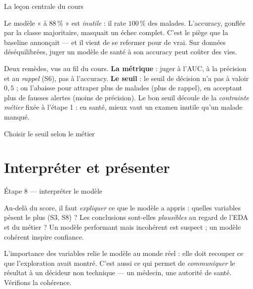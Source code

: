 \documentclass[aspectratio=169,11pt]{beamer}
\begin{document}
\begin{frame}{La leçon centrale du cours}
\begin{ucadret}
{\small Le modèle « à $88\,\%$ » est \emph{inutile} : il rate $100\,\%$ des malades. L'accuracy, gonflée par la classe majoritaire, masquait un échec complet. C'est le piège que la baseline annonçait — et il vient de se refermer pour de vrai. Sur données déséquilibrées, juger un modèle de santé à son accuracy peut coûter des vies.}
\end{ucadret}
{\small Deux remèdes, vus au fil du cours. \textbf{La métrique} : juger à l'AUC, à la précision et au \emph{rappel} (S6), pas à l'accuracy. \textbf{Le seuil} : le seuil de décision n'a pas à valoir $0{,}5$ ; on l'abaisse pour attraper plus de malades (plus de rappel), en acceptant plus de fausses alertes (moins de précision). Le bon seuil découle de la \emph{contrainte métier} fixée à l'étape 1 : en santé, mieux vaut un examen inutile qu'un malade manqué.}
\end{frame}

\begin{frame}{Choisir le seuil selon le métier}
\end{frame}

\section{Interpréter et présenter}

\begin{frame}{Étape 8 — interpréter le modèle}
\begin{ucaddef}
{\small Au-delà du score, il faut \emph{expliquer} ce que le modèle a appris : quelles variables pèsent le plus (S3, S8) ? Les conclusions sont-elles \emph{plausibles} au regard de l'EDA et du métier ? Un modèle performant mais incohérent est suspect ; un modèle cohérent inspire confiance.}
\end{ucaddef}
{\small L'importance des variables relie le modèle au monde réel : elle doit recouper ce que l'exploration avait montré. C'est aussi ce qui permet de \emph{communiquer} le résultat à un décideur non technique — un médecin, une autorité de santé. Vérifions la cohérence.}
\end{frame}
\end{document}
